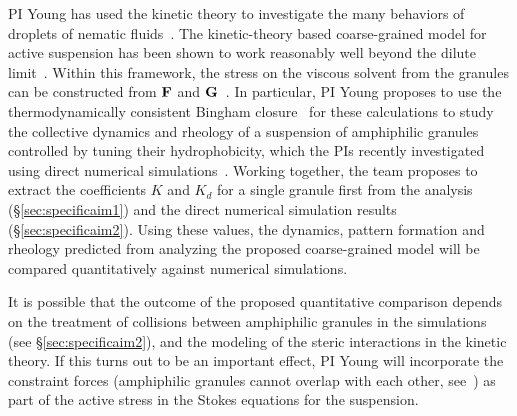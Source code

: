 PI Young has used the kinetic theory to investigate the many behaviors
of droplets of nematic fluids~\cite{YoungShelleyStein2021_MBE}. The
kinetic-theory based coarse-grained model for active suspension has been
shown to work reasonably well beyond the dilute
limit~\cite{Saintillan2018_ARFM}. Within this framework, the stress on
the viscous solvent from the granules can be constructed from ${\bf F}$
and ${\bf G}$~\cite{TraversoMichellin2020_PRF,
TraversoMichellin2022_JFM}. In particular, PI Young proposes to use the
thermodynamically consistent Bingham
closure~\cite{YoungShelleyStein2021_MBE} for these calculations to study
the collective dynamics and rheology of a suspension of amphiphilic
granules controlled by tuning their hydrophobicity, which the PIs
recently investigated using direct numerical
simulations~\cite{fu-ryh-qua-you2022}. Working together, the team
proposes to extract the coefficients $K$ and $K_d$ for a single granule
first from the analysis (\S\ref{sec:specificaim1}) and the direct
numerical simulation results (\S\ref{sec:specificaim2}). Using these
values, the dynamics, pattern formation and rheology predicted from
analyzing the proposed coarse-grained model will be compared
quantitatively against numerical simulations. 

It is possible that the outcome of the proposed quantitative comparison
depends on the treatment of collisions between amphiphilic granules in
the simulations (see \S\ref{sec:specificaim2}), and the modeling of the
steric interactions in the kinetic theory. If this turns out to be an
important effect, PI Young will incorporate the
constraint forces (amphiphilic granules cannot overlap with each other,
see~\cite{Weady2022_PRF}) as part of the active stress in the Stokes
equations for the suspension. 

